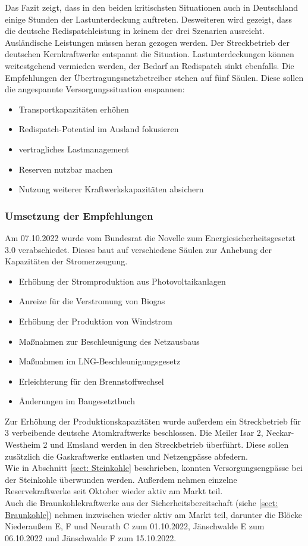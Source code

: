		Das Fazit zeigt, dass in den beiden kritischsten Situationen auch in Deutschland einige Stunden der Lastunterdeckung auftreten. Desweiteren wird gezeigt, dass die deutsche Redispatchleistung in keinem der drei Szenarien ausreicht. Ausländische Leistungen müssen heran gezogen werden. Der Streckbetrieb der deutschen Kernkraftwerke entspannt die Situation. Lastunterdeckungen können weitestgehend vermieden werden, der Bedarf an Redispatch sinkt ebenfalls. Die Empfehlungen der Übertragungsnetzbetreiber stehen auf fünf Säulen. Diese sollen die angespannte Versorgungssituation enspannen:
			\begin{itemize}
				\item Transportkapazitäten erhöhen
				\item Redispatch-Potential im Ausland fokusieren
				\item vertragliches Lastmanagement
				\item Reserven nutzbar machen
				\item Nutzung weiterer Kraftwerkskapazitäten absichern
			\end{itemize}
		
		\subsubsection{Umsetzung der Empfehlungen}
		Am 07.10.2022 wurde vom Bundesrat die Novelle zum Energiesicherheitsgesetzt 3.0 verabschiedet. Dieses baut auf verschiedene Säulen zur Anhebung der Kapazitäten der Stromerzeugung. 
			\begin{itemize}
				\item Erhöhung der Stromproduktion aus Photovoltaikanlagen
				\item Anreize für die Verstromung von Biogas
				\item Erhöhung der Produktion von Windstrom
				\item Maßnahmen zur Beschleunigung des Netzausbaus
				\item Maßnahmen im LNG-Beschleunigungsgesetz
				\item Erleichterung für den Brennstoffwechsel
				\item Änderungen im Baugesetztbuch
			\end{itemize}
		
		Zur Erhöhung der Produktionskapazitäten wurde außerdem ein Streckbetrieb für 3 verbeibende deutsche Atomkraftwerke beschlossen. Die Meiler Isar 2, Neckar-Westheim 2 und Emsland werden in den Streckbetrieb überführt. Diese sollen zusätzlich die Gaskraftwerke entlasten und Netzengpässe abfedern.\\
		Wie in Abschnitt \ref{sect: Steinkohle} beschrieben, konnten Versorgungsengpässe bei der Steinkohle überwunden werden. Außerdem nehmen einzelne Reservekraftwerke seit Oktober wieder aktiv am Markt teil.\\
		Auch die Braunkohlekraftwerke aus der Sicherheitsbereitschaft (siehe \ref{sect: Braunkohle}) nehmen inzwischen wieder aktiv am Markt teil, darunter die Blöcke Niederaußem E, F und Neurath C zum 01.10.2022, Jänschwalde E zum 06.10.2022 und Jänschwalde F zum 15.10.2022.\\
		

